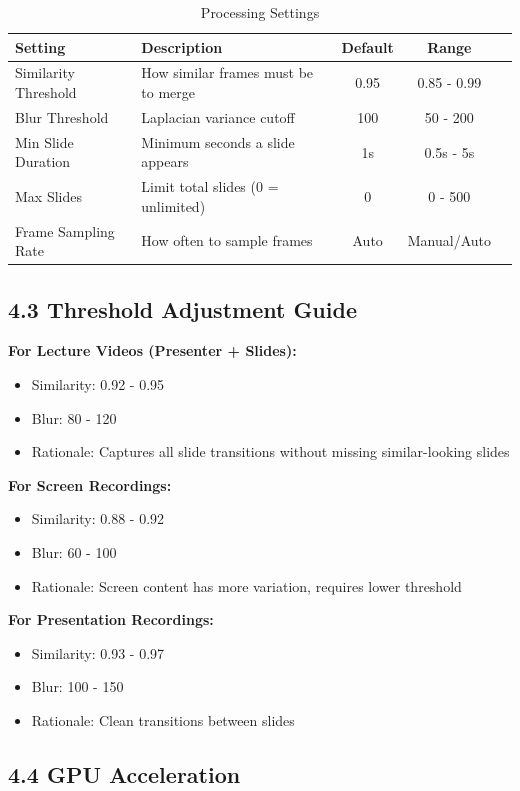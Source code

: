 \documentclass[12pt,a4paper]{article}
\newcommand{\subsectionTitle}[1]{\subsection*{#1}}
\begin{document}
\begin{table}[H]
    \centering
    \caption{Processing Settings}
    \begin{tabular}{lp{4cm}ccc}
        \toprule
        \textbf{Setting} & \textbf{Description} & \textbf{Default} & \textbf{Range} \\
        \midrule
        Similarity Threshold & How similar frames must be to merge & 0.95 & 0.85 - 0.99 \\
        Blur Threshold & Laplacian variance cutoff & 100 & 50 - 200 \\
        Min Slide Duration & Minimum seconds a slide appears & 1s & 0.5s - 5s \\
        Max Slides & Limit total slides (0 = unlimited) & 0 & 0 - 500 \\
        Frame Sampling Rate & How often to sample frames & Auto & Manual/Auto \\
        \bottomrule
    \end{tabular}
\end{table}

\subsectionTitle{4.3 Threshold Adjustment Guide}

\textbf{For Lecture Videos (Presenter + Slides):}
\begin{itemize}
    \item Similarity: 0.92 - 0.95
    \item Blur: 80 - 120
    \item Rationale: Captures all slide transitions without missing similar-looking slides
\end{itemize}

\textbf{For Screen Recordings:}
\begin{itemize}
    \item Similarity: 0.88 - 0.92
    \item Blur: 60 - 100
    \item Rationale: Screen content has more variation, requires lower threshold
\end{itemize}

\textbf{For Presentation Recordings:}
\begin{itemize}
    \item Similarity: 0.93 - 0.97
    \item Blur: 100 - 150
    \item Rationale: Clean transitions between slides
\end{itemize}

\subsectionTitle{4.4 GPU Acceleration}
\end{document}
